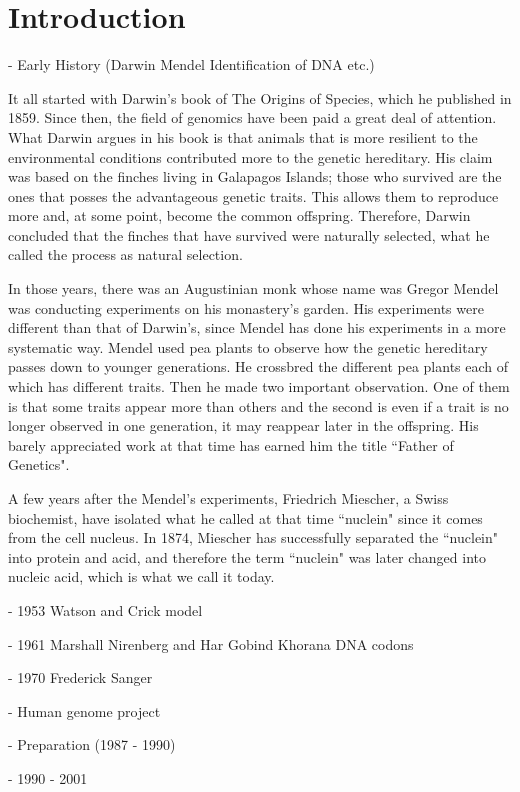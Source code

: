 \chapter{Introduction}
- Early History (Darwin Mendel Identification of DNA etc.)

It all started with Darwin's book of The Origins of Species, which he published in 1859. Since then, the field of genomics have been paid a great deal of attention. What Darwin argues in his book is that animals that is more resilient to the environmental conditions contributed more to the genetic hereditary. His claim was based on the finches living in Galapagos Islands; those who survived are the ones that posses the advantageous genetic traits. This allows them to reproduce more and, at some point, become the common offspring. Therefore, Darwin concluded that the finches that have survived were naturally selected, what he called the process as natural selection.

In those years, there was an Augustinian monk whose name was Gregor Mendel was conducting experiments on his monastery's garden. His experiments were different than that of Darwin's, since Mendel has done his experiments in a more systematic way. Mendel used pea plants to observe how the genetic hereditary passes down to younger generations. He crossbred the different pea plants each of which has different traits. Then he made two important observation. One of them is that some traits appear more than others and the second is even if a trait is no longer observed in one generation, it may reappear later in the offspring. His barely appreciated work at that time has earned him the title ``Father of Genetics".

A few years after the Mendel's experiments, Friedrich Miescher, a Swiss biochemist, have isolated what he called at that time ``nuclein" since it comes from the cell nucleus. In 1874, Miescher has successfully separated the ``nuclein" into protein and acid, and therefore the term ``nuclein" was later changed into nucleic acid, which is what we call it today\cite{pray2008discovery}.

- 1953 Watson and Crick model

- 1961 Marshall Nirenberg and Har Gobind Khorana DNA codons

- 1970 Frederick Sanger

- Human genome project

    - Preparation (1987 - 1990)

    - 1990 - 2001
    
